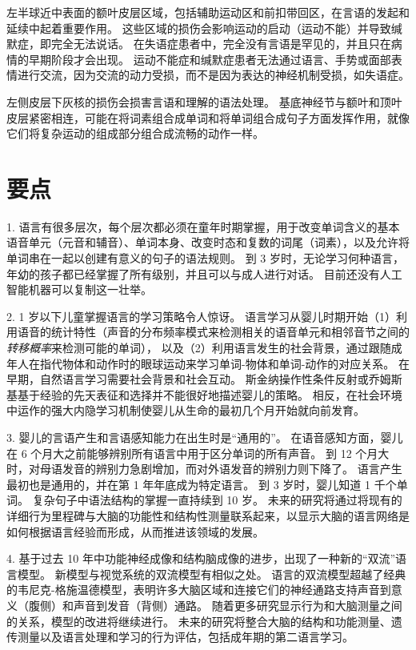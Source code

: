 左半球近中表面的额叶皮层区域，包括辅助运动区和前扣带回区，在言语的发起和延续中起着重要作用。
这些区域的损伤会影响运动的启动（运动不能）并导致缄默症，即完全无法说话。
在失语症患者中，完全没有言语是罕见的，并且只在病情的早期阶段才会出现。
运动不能症和缄默症患者无法通过语言、手势或面部表情进行交流，因为交流的动力受损，而不是因为表达的神经机制受损，如失语症。


左侧皮层下灰核的损伤会损害言语和理解的语法处理。
基底神经节与额叶和顶叶皮层紧密相连，可能在将词素组合成单词和将单词组合成句子方面发挥作用，就像它们将复杂运动的组成部分组合成流畅的动作一样。



\section{要点}

1. 语言有很多层次，每个层次都必须在童年时期掌握，用于改变单词含义的基本语音单元（元音和辅音）、单词本身、改变时态和复数的词尾（词素），以及允许将单词串在一起以创建有意义的句子的语法规则。
到 3 岁时，无论学习何种语言，年幼的孩子都已经掌握了所有级别，并且可以与成人进行对话。
目前还没有人工智能机器可以复制这一壮举。 


2. 1 岁以下儿童掌握语言的学习策略令人惊讶。
语言学习从婴儿时期开始（1）利用语音的统计特性（声音的分布频率模式来检测相关的语音单元和相邻音节之间的\textit{转移概率}来检测可能的单词），
以及（2）利用语言发生的社会背景，通过跟随成年人在指代物体和动作时的眼球运动来学习单词-物体和单词-动作的对应关系。
在早期，自然语言学习需要社会背景和社会互动。
斯金纳操作性条件反射或乔姆斯基基于经验的先天表征和选择并不能很好地描述婴儿的策略。
相反，在社会环境中运作的强大内隐学习机制使婴儿从生命的最初几个月开始就向前发育。


3. 婴儿的言语产生和言语感知能力在出生时是“通用的”。
在语音感知方面，婴儿在 6 个月大之前能够辨别所有语言中用于区分单词的所有声音。
到 12 个月大时，对母语发音的辨别力急剧增加，而对外语发音的辨别力则下降了。
语言产生最初也是通用的，并在第 1 年年底成为特定语言。
到 3 岁时，婴儿知道 1 千个单词。
复杂句子中语法结构的掌握一直持续到 10 岁。
未来的研究将通过将现有的详细行为里程碑与大脑的功能性和结构性测量联系起来，以显示大脑的语言网络是如何根据语言经验而形成，从而推进该领域的发展。


4. 基于过去 10 年中功能神经成像和结构脑成像的进步，出现了一种新的“双流”语言模型。
新模型与视觉系统的双流模型有相似之处。
语言的双流模型超越了经典的韦尼克-格施温德模型，表明许多大脑区域和连接它们的神经通路支持声音到意义（腹侧）和声音到发音（背侧）通路。
随着更多研究显示行为和大脑测量之间的关系，模型的改进将继续进行。
未来的研究将整合大脑的结构和功能测量、遗传测量以及语言处理和学习的行为评估，包括成年期的第二语言学习。


